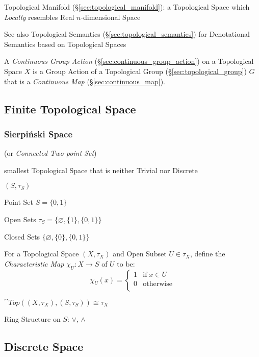\fist Topological Manifold (\S\ref{sec:topological_manifold}): a Topological
Space which \emph{Locally} resembles Real $n$-dimensional Space

\fist See also Topological Semantics
(\S\ref{sec:topological_semantics}) for Denotational Semantics based
on Topological Spaces

A \emph{Continuous Group Action} (\S\ref{sec:continuous_group_action}) on a
Topological Space $X$ is a Group Action of a Topological Group
(\S\ref{sec:topological_group}) $G$ that is a \emph{Continuous Map}
(\S\ref{sec:continuous_map}).



\subsection{Finite Topological Space}
\label{sec:finite_topological_space}

\subsubsection{Sierpi\'nski Space}\label{sec:sierpinski_space}

(or \emph{Connected Two-point Set})

smallest Topological Space that is neither Trivial nor Discrete

$(S,\tau_S)$

Point Set $S = \{0,1\}$

Open Sets $\tau_S = \{\varnothing, \{1\}, \{0,1\}\}$

Closed Sets $\{\varnothing, \{0\}, \{0,1\}\}$

For a Topological Space $(X,\tau_X)$ and Open Subset $U \in \tau_X$,
define the \emph{Characteristic Map} $\chi_U : X \rightarrow S$ of $U$ to be:
\[
  \chi_U (x) =
  \begin{cases}
    1  & \text{if}\; x \in U \\
    0  & \text{otherwise} \\
  \end{cases}
\]

$\cat{Top}((X,\tau_X),(S,\tau_S)) \cong \tau_X$

Ring Structure on $S$: $\vee$, $\wedge$



\subsection{Discrete Space}\label{sec:discrete_space}

